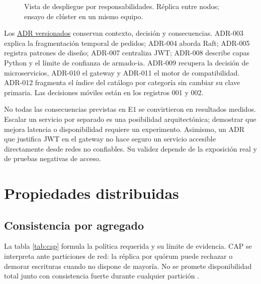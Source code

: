 \documentclass[12pt,a4paper]{article}
\newcommand{\evidencia}[2]{\href{https://github.com/JoseLozanoMorales/TiendaTech/blob/e6680b0290d2c6921ea47116c2df60bd7b055de0/#1}{#2}}
\newcommand{\seccion}[1]{\section{#1}}
\begin{document}
\begin{figure}[H]\centering
{}
\caption{Vista de despliegue por responsabilidades. Réplica entre nodos; ensayo de clúster en un mismo equipo.}\label{fig:despliegue}
\end{figure}

Los \evidencia{docs/adr}{ADR versionados} conservan contexto, decisión y consecuencias. ADR-003 explica la fragmentación temporal de pedidos; ADR-004 aborda Raft; ADR-005 registra patrones de diseño; ADR-007 centraliza JWT; ADR-008 describe capas Python y el límite de confianza de armado-ia. ADR-009 recupera la decisión de microservicios, ADR-010 el gateway y ADR-011 el motor de compatibilidad. ADR-012 fragmenta el índice del catálogo por categoría sin cambiar su clave primaria. Las decisiones móviles están en los registros 001 y 002.

No todas las consecuencias previstas en E1 se convirtieron en resultados medidos. Escalar un servicio por separado es una posibilidad arquitectónica; demostrar que mejora latencia o disponibilidad requiere un experimento. Asimismo, un ADR que justifica JWT en el gateway no hace seguro un servicio accesible directamente desde redes no confiables. Su validez depende de la exposición real y de pruebas negativas de acceso.

\seccion{Propiedades distribuidas}
\subsection{Consistencia por agregado}
La tabla \ref{tab:cap} formula la política requerida y su límite de evidencia. CAP se interpreta ante particiones de red: la réplica por quórum puede rechazar o demorar escrituras cuando no dispone de mayoría. No se promete disponibilidad total junto con consistencia fuerte durante cualquier partición \cite{gilbert2002,brewer2012cap,abadi2012consistency}.
\end{document}

